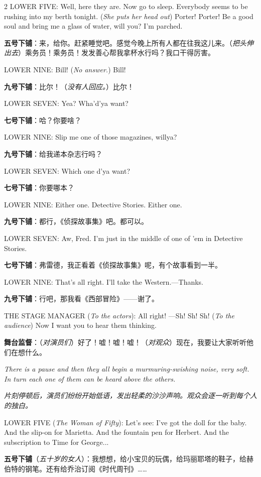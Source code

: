 \documentclass[lang=cn,newtx,10pt,scheme=chinese]{elegantbook}
\newcommand{\pair}[2]{%
\switchcolumn* #2\par
\switchcolumn  #1\par
}
\begin{document}
\begin{paracol}{2}
\pair{
    \textbf{五号下铺}：来，给你。赶紧睡觉吧。感觉今晚上所有人都在往我这儿来。（\textit{把头伸出去}）乘务员！乘务员！发发善心帮我拿杯水行吗？我口干得厉害。
}{
    LOWER FIVE: Well, here they are. Now go to sleep. Everybody seems to be rushing into my berth tonight. (\textit{She puts her head out}) Porter! Porter! Be a good soul and bring me a glass of water, will you? I'm parched.
}

\pair{
    \textbf{九号下铺}：比尔！（\textit{没有人回应。}）比尔！
}{
    LOWER NINE: Bill! (\textit{No answer.}) Bill!
}

\pair{
    \textbf{七号下铺}：哈？你要啥？
}{
    LOWER SEVEN: Yea? Wha'd'ya want?
}

\pair{
    \textbf{九号下铺}：给我递本杂志行吗？
}{
    LOWER NINE: Slip me one of those magazines, willya?
}

\pair{
    \textbf{七号下铺}：你要哪本？
}{
    LOWER SEVEN: Which one d'ya want?
}

\pair{
    \textbf{九号下铺}：都行，《侦探故事集》吧。都可以。
}{
    LOWER NINE: Either one. Detective Stories. Either one.
}

\pair{
    \textbf{七号下铺}：弗雷德，我正看着《侦探故事集》呢，有个故事看到一半。
}{
    LOWER SEVEN: Aw, Fred. I'm just in the middle of one of 'em in Detective Stories.
}

\pair{
    \textbf{九号下铺}：行吧，那我看《西部冒险》——谢了。
}{
    LOWER NINE: That's all right. I'll take the Western.—Thanks.
}

\pair{
    \textbf{舞台监督}：（\textit{对演员们}）好了！嘘！嘘！嘘！（\textit{对观众}）现在，我要让大家听听他们在想什么。
}{
    THE STAGE MANAGER (\textit{To the actors}): All right! —Sh! Sh! Sh! (\textit{To the audience}) Now I want you to hear them thinking.
    \newline
    \newline
}

\pair{
    \textit{片刻停顿后，演员们纷纷开始低语，发出轻柔的沙沙声响。观众会逐一听到每个人的独白。}
}{
    \textit{There is a pause and then they all begin a murmuring-swishing noise, very soft. In turn each one of them can be heard above the others.}
    \newline
    \newline
}

\pair{
    \textbf{五号下铺}（\textit{五十岁的女人}）：我想想，给小宝贝的玩偶，给玛丽耶塔的鞋子，给赫伯特的钢笔。还有给乔治订阅《时代周刊》……
}{
    LOWER FIVE (\textit{The Woman of Fifty}): Let's see: I've got the doll for the baby. And the slip-on for Marietta. And the fountain pen for Herbert. And the subscription to Time for George...
}


\end{paracol}
\end{document}
